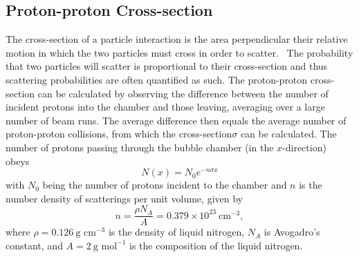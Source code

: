 \documentclass[twocolumn]{article}
\begin{document}
\subsection{Proton-proton Cross-section}
The cross-section of a particle interaction is the area perpendicular their relative motion in which the two particles must cross in order to scatter.~\cite{Thompson} The probability that two particles will scatter is proportional to their cross-section and thus scattering probabilities are often quantified as such. The proton-proton cross-section can be calculated by observing the difference between the number of incident protons into the chamber and those leaving, averaging over a large number of beam runs. The average difference then equals the average number of proton-proton collisions, from which the cross-section$\sigma$ can be calculated. The number of protons passing through the bubble chamber (in the $x$-direction) obeys~\cite{seul}
\begin{equation} \label{eq:cross}
N(x) = N_0 e^{-n \sigma x}
\end{equation}
with $N_0$ being the number of protons incident to the chamber and $n$ is the number density of scatterings per unit volume, given by
\begin{equation*}
n = \frac {\rho N_A} {A} = 0.379 \times 10^{23} ~\text{cm}^{-3},
\end{equation*}
where $\rho=0.126 ~\text{g cm}^{-3}$ is the density of liquid nitrogen, $N_A$ is Avogadro's constant, and $A=2 ~\text{g mol}^{-1}$ is the composition of the liquid nitrogen.
\end{document}
